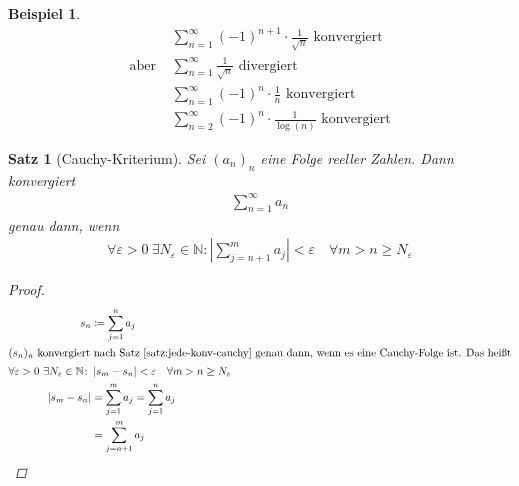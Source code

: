 \documentclass[11pt, twoside, a4paper]{article}
\theoremstyle{plain}
\newtheorem{satz}[blockelement]{Satz}
\newtheorem{beispiel}[blockelement]{Beispiel}
\newcommand{\pair}[1]{\left(#1\right)}
\newcommand{\abs}[1]{\left\lvert#1\right\rvert}
\newcommand{\definedas}[0]{\coloneqq}
\newcommand{\N}{\mathbb{N}}
\begin{document}
    \begin{beispiel}
        \begin{align*}
            &\sum_{n=1}^{\infty} \pair{-1}^{n+1} \cdot \frac{1}{\sqrt{n}}\text{ konvergiert}\\
            \text{aber } &\sum_{n=1}^{\infty} \frac{1}{\sqrt {n}} \text{ divergiert}\\
            &\sum_{n=1}^{\infty} (-1)^{n} \cdot \frac{1}{n}\text{ konvergiert}\\
            &\sum_{n=2}^{\infty} (-1)^n \cdot \frac{1}{\log\pair{n}}\text{ konvergiert}
        \end{align*}
    \end{beispiel}

    \begin{satz}[Cauchy-Kriterium] %
        \label{satz:cauchy-kriterium}
        Sei $(a_n)_n$ eine Folge reeller Zahlen. Dann konvergiert
        \begin{align*}
            \sum_{n=1}^{\infty} a_n
        \end{align*}
        genau dann, wenn
        \begin{align*}
            \forall \varepsilon > 0~\exists N_{\varepsilon}\in\N\colon \abs{\sum_{j=n+1}^{m} a_j} <\varepsilon\quad\forall m>n\geq N_{\varepsilon}
        \end{align*}
        \begin{proof}
            \begin{align*}
                s_n &\definedas \sum_{j=1}^{n} a_j\\
                \intertext{$(s_n)_n$ konvergiert nach Satz~\ref{satz:jede-konv-cauchy} genau dann, wenn es eine Cauchy-Folge ist. Das heißt}
                \forall\varepsilon > 0~\exists N_{\varepsilon}\in\N\colon &\abs{s_{m} - s_{n}} < \varepsilon\quad\forall m> n \geq N_{\varepsilon}\\
                \abs{s_m - s_n} &= \sum_{j=1}^{m} a_j = \sum_{j=1}^{n} a_j\\
                &= \sum_{j=n+1}^{m} a_j\qedhere
            \end{align*}
        \end{proof}
    \end{satz}
\end{document}
